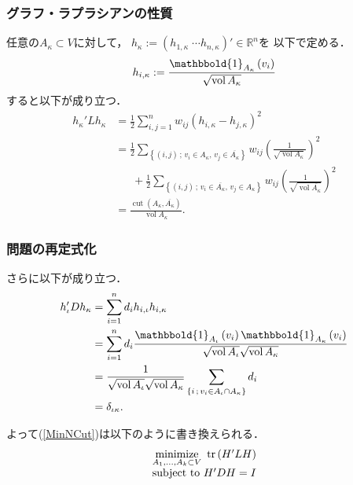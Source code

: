 \documentclass[10pt,hyperref={unicode}]{beamer}
\DeclareMathOperator*{\cut}{cut}
\DeclareMathOperator*{\tr}{tr}
\DeclareMathOperator*{\vol}{vol}
\newcommand{\pref}[1]{{\fontfamily{cmr}\selectfont (\ref{#1})}}
\newcommand{\parentheses}[1]{\left(#1\right)}
\newcommand{\braces}[1]{\left\{#1\right\}}
\begin{document}
\begin{frame}
\frametitle{グラフ・ラプラシアンの性質}
任意の$A_\kappa \subset V$に対して，
$h_\kappa := \parentheses{h_{1,\kappa} \; \cdots h_{n,\kappa}}' \in \mathbb{R}^n$を
以下で定める．
\begin{align*}
    h_{i,\kappa} := \frac{\mathbbold{1}_{A_{\kappa}}\parentheses{v_i}}{\sqrt{\vol A_{\kappa}}}
\end{align*}
すると以下が成り立つ．
\begin{align*}
    h_{\kappa}'Lh_{\kappa}
    &= \frac{1}{2} \sum_{i,j = 1}^n w_{ij} \parentheses{h_{i,\kappa} - h_{j,\kappa}}^2 \\
    &= \frac{1}{2}
    \sum_{\braces{\parentheses{i,j}\,;\, v_i \in A_{\kappa},\,v_j \in \overline{A_{\kappa}}}}
        w_{ij} \parentheses{\frac{1}{\sqrt{\vol A_{\kappa}}}}^2 \\
    & \phantom{=}\ + \frac{1}{2}
        \sum_{\braces{\parentheses{i,j}\,;\, v_i \in \overline{A_{\kappa}},\,v_j \in A_{\kappa}}}
        w_{ij} \parentheses{\frac{1}{\sqrt{\vol{\overline{A_{\kappa}}}}}}^2 \\
    &= \frac{\cut\parentheses{A_{\kappa},\overline{A_{\kappa}}}}{\vol A_{\kappa}}.
\end{align*}
\end{frame}

\begin{frame}
\frametitle{問題の再定式化}
さらに以下が成り立つ．
\begin{align*}
    h_{\iota}'Dh_{\kappa}
    &= \sum_{i = 1}^n d_i h_{i,\iota}h_{i,\kappa} \\
    &= \sum_{i = 1}^n d_i \frac{\mathbbold{1}_{A_{\iota}}\parentheses{v_i}\mathbbold{1}_{A_{\kappa}}\parentheses{v_i}}{{\sqrt{\vol A_\iota}\sqrt{\vol A_\kappa}}} \\
    &= \frac{1}{\sqrt{\vol A_\iota}\sqrt{\vol A_\kappa}} \sum_{\braces{i \,;\, v_i \in A_{\iota} \cap A_{\kappa}}} d_i \\
    &= \delta_{\iota\kappa}.
\end{align*}

よって\pref{MinNCut}は以下のように書き換えられる．
\begin{align}
    \begin{array}{l}
        \underset{A_1,\ldots,A_k \subset V}{\mathrm{minimize}}\ \tr\parentheses{H'LH} \\[1.5\jot]
        \mathrm{subject\ to}\ H'DH = I
    \end{array} \label{MinNCut2}
\end{align}
\end{frame}
\end{document}
